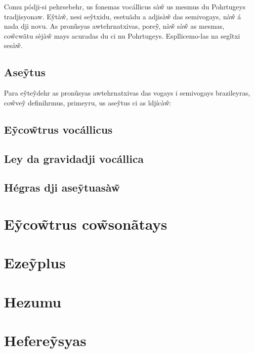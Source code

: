 \documentclass[12pt, a5paper, titlepage]{article}
\begin{document}
\begin{bilingualpages}
    Comu pódji-si pehrsebehr, us fonemas vocállicus sà\~w us mesmus du Pohrtugeys
    tradjisyonaw. E\~ytà\~w, nesi se\~ytxidu, esetuãdu a adjisà\~w das semivogays,
    nà\~w á nada dji novu. As pronũsyas awtehrnatxivas, pore\~y, nà\~w sà\~w as
    mesmas, co\~wcwãtu sèjà\~w mays acuradas du ci nu Pohrtugeys. Espllicemo-las na
    segĩtxi sesà\~w.

    \subsection{Ase\~ytus}
    Para e\~yte\~ydehr as pronũsyas awtehrnatxivas das vogays i semivogays
    brazileyras, co\~wve\~y definihrmus, primeyru, us ase\~ytus ci as ĩdjícà\~w:

    \BrTableDiacritics

    \subsection{E\~yco\~wtrus vocállicus}
    \subsection{Ley da gravidadji vocállica}
    \subsection{Hégras dji ase\~ytuasà\~w}

    \section{E\~yco\~wtrus co\~wsonãtays}

    \section{Eze\~yplus}

\end{bilingualpages}

\newpage
\section{Hezumu}

\newpage
\section{Hefere\~ysyas}
\end{document}
